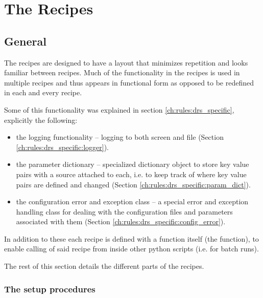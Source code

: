 \chapter{The Recipes}
\label{ch:the_recipes}


\ifdevguide
\section{General}
\label{ch:the_recipes:gen_layout}

The recipes are designed to have a layout that minimizes repetition and looks familiar between recipes. Much of the functionality in the recipes is used in multiple recipes and thus appears in functional form as opposed to be redefined in each and every recipe.

Some of this functionality was explained in section \ref{ch:rules:drs_specific}, explicitly the following:
\begin{itemize}
	\item the logging functionality -- logging to both screen and file (Section \ref{ch:rules:drs_specific:logger}).
	\item the parameter dictionary -- specialized dictionary object to store key value pairs with a source attached to each, i.e. to keep track of where key value pairs are defined and changed (Section \ref{ch:rules:drs_specific:param_dict}).
	\item the configuration error and exception class -- a special error and exception handling class for dealing with the configuration files and parameters associated with them (Section \ref{ch:rules:drs_specific:config_error}).
\end{itemize}

\vspace{0.5cm}
\noindent In addition to these each recipe is defined with a function itself (the \progMAIN function), to enable calling of said recipe from inside other python scripts (i.e. for batch runs).

\vspace{0.5cm}
\noindent The rest of this section details the different parts of the recipes.

\subsection{The setup procedures}
\label{ch:the_recipes:gen_layout:setup}


